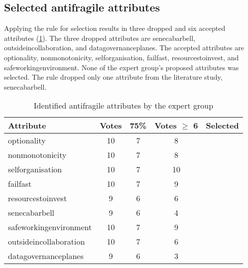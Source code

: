 \subsection{Selected antifragile attributes}
\label{sub:validationselectedafattributes}
Applying the rule for selection results in three dropped and six accepted \glspl{attribute} (\cref{tab:expertgrouppossiblesf}). The three dropped \glspl{attribute} are \gls{senecabarbell}, \gls{outsideincollaboration}, and \gls{datagovernanceplanes}. The accepted \glspl{attribute} are \gls{optionality}, \gls{nonmonotonicity}, \gls{selforganisation}, \gls{failfast}, \gls{resourcestoinvest}, and \gls{safeworkingenvironment}. None of the expert group's proposed \glspl{attribute} was selected. The rule dropped only one \gls{attribute} from the literature study, \gls{senecabarbell}.
\begin{longtable}{@{}lcccc@{}}
	\toprule%
	\textbf{Attribute} & \textbf{Votes} & \textbf{75\%} & \textbf{Votes $\geq$ 6} & \textbf{Selected} \\%
	\midrule%
	\endhead%
	\hline
	\endfoot%
	\caption[Identified antifragile attributes by the expert group]{Identified antifragile attributes by the expert group}
	\label{tab:expertgrouppossiblesf}
	\endlastfoot%
	\Gls{optionality} & 10 & 7 & 8 & \checkmark \\%
	\Gls{nonmonotonicity} & 10 & 7 & 8 & \checkmark \\%
	\Gls{selforganisation} & 10 & 7 & 10 & \checkmark \\%
	\Gls{failfast} & 10 & 7 & 9 & \checkmark \\%
	\Gls{resourcestoinvest} & 9 & 6 & 6 &  \checkmark\\%
	\Gls{senecabarbell} & 9 & 6 & 4 & \\%
	\Gls{safeworkingenvironment} & 10 & 7 & 9 & \checkmark \\%
	\Gls{outsideincollaboration} & 10 & 7 & 6 & \\%
	\Gls{datagovernanceplanes} & 9 & 6 & 3 & \\%
	\bottomrule%
\end{longtable}%

